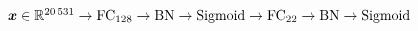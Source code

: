 $\vect{x} \in \real^{\num{20531}}
	\newline \rightarrow \text{FC}_{128} \rightarrow \text{BN} \rightarrow \text{Sigmoid}
	\newline \rightarrow \text{FC}_{22} \rightarrow \text{BN} \rightarrow \text{Sigmoid}$
